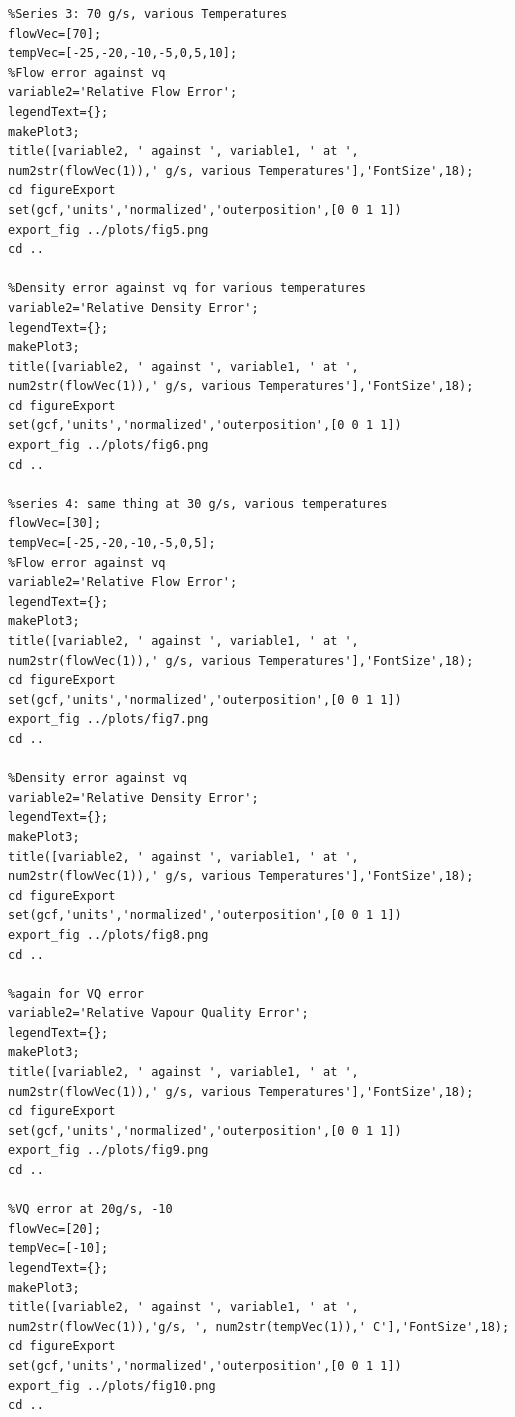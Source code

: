 \documentclass{report}
\begin{document}
\begin{verbatim}
%Series 3: 70 g/s, various Temperatures
flowVec=[70];
tempVec=[-25,-20,-10,-5,0,5,10];
%Flow error against vq
variable2='Relative Flow Error';
legendText={};
makePlot3;
title([variable2, ' against ', variable1, ' at ', num2str(flowVec(1)),' g/s, various Temperatures'],'FontSize',18);
cd figureExport
set(gcf,'units','normalized','outerposition',[0 0 1 1])
export_fig ../plots/fig5.png
cd ..

%Density error against vq for various temperatures
variable2='Relative Density Error';
legendText={};
makePlot3;
title([variable2, ' against ', variable1, ' at ', num2str(flowVec(1)),' g/s, various Temperatures'],'FontSize',18);
cd figureExport
set(gcf,'units','normalized','outerposition',[0 0 1 1])
export_fig ../plots/fig6.png
cd ..

%series 4: same thing at 30 g/s, various temperatures
flowVec=[30];
tempVec=[-25,-20,-10,-5,0,5];
%Flow error against vq
variable2='Relative Flow Error';
legendText={};
makePlot3;
title([variable2, ' against ', variable1, ' at ', num2str(flowVec(1)),' g/s, various Temperatures'],'FontSize',18);
cd figureExport
set(gcf,'units','normalized','outerposition',[0 0 1 1])
export_fig ../plots/fig7.png
cd ..

%Density error against vq
variable2='Relative Density Error';
legendText={};
makePlot3;
title([variable2, ' against ', variable1, ' at ', num2str(flowVec(1)),' g/s, various Temperatures'],'FontSize',18);
cd figureExport
set(gcf,'units','normalized','outerposition',[0 0 1 1])
export_fig ../plots/fig8.png
cd ..

%again for VQ error
variable2='Relative Vapour Quality Error';
legendText={};
makePlot3;
title([variable2, ' against ', variable1, ' at ', num2str(flowVec(1)),' g/s, various Temperatures'],'FontSize',18);
cd figureExport
set(gcf,'units','normalized','outerposition',[0 0 1 1])
export_fig ../plots/fig9.png
cd ..

%VQ error at 20g/s, -10
flowVec=[20];
tempVec=[-10];
legendText={};
makePlot3;
title([variable2, ' against ', variable1, ' at ', num2str(flowVec(1)),'g/s, ', num2str(tempVec(1)),' C'],'FontSize',18);
cd figureExport
set(gcf,'units','normalized','outerposition',[0 0 1 1])
export_fig ../plots/fig10.png
cd ..


\end{verbatim}
\end{document}
